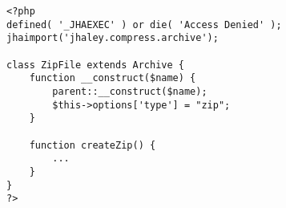 \begin{lstlisting}[label=compress_zip,caption=Compresos Zip.]
<?php
defined( '_JHAEXEC' ) or die( 'Access Denied' );
jhaimport('jhaley.compress.archive');

class ZipFile extends Archive {
	function __construct($name) {
		parent::__construct($name);
		$this->options['type'] = "zip";
	}

	function createZip() {
		...
	}
}
?>
\end{lstlisting}
